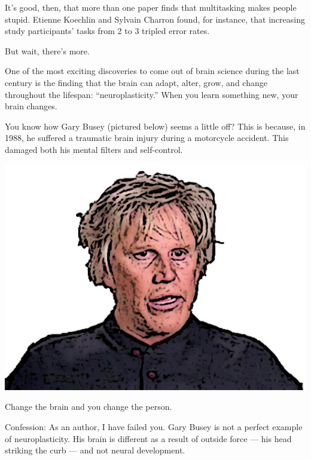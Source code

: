 It's good, then, that more than one paper finds that multitasking makes people stupid. Etienne
Koechlin and Sylvain Charron found, for instance, that increasing study
participants' tasks from 2 to 3 tripled error rates. \cite{charron2010divided}

But wait, there's more.

One of the most exciting discoveries to come out of brain science during
the
last century is the finding that the brain can adapt, alter, grow, and change
throughout the lifespan: ``neuroplasticity.''
When you learn something new, your brain changes.

You know how Gary Busey (pictured below) seems a little off? This is because, in 1988, he
suffered a traumatic brain injury during a motorcycle accident. This damaged both his mental filters and self-control.

\includegraphics[width=\textwidth]{graphics/gary-busey.jpg}

Change the brain and you change the person.

Confession: As an author, I have
failed you. Gary Busey is not a perfect example of neuroplasticity. His brain is
different as a result of outside force --- his head striking
the curb --- and not neural development.

